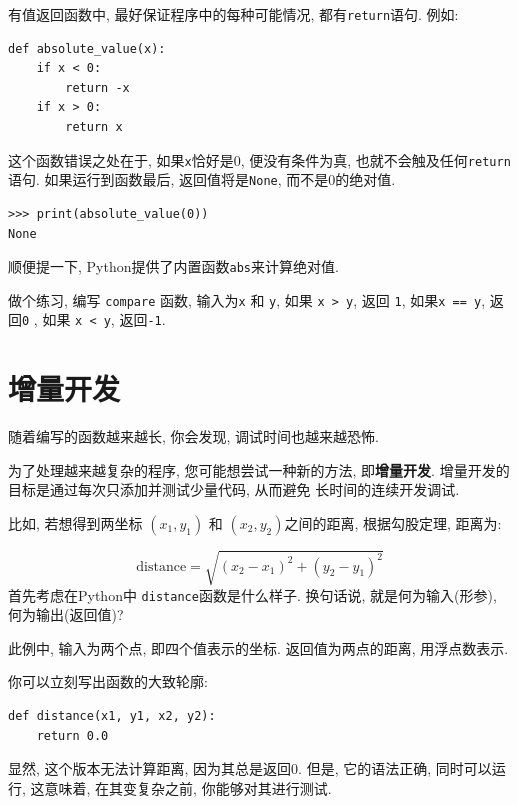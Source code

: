 \documentclass[10pt]{book}
\begin{document}
有值返回函数中, 最好保证程序中的每种可能情况, 都有{\tt return}语句. 例如:

\begin{verbatim}
def absolute_value(x):
    if x < 0:
        return -x
    if x > 0:
        return x
\end{verbatim}
%

这个函数错误之处在于, 如果{\tt x}恰好是0,
便没有条件为真, 也就不会触及任何{\tt return}语句. 
如果运行到函数最后, 返回值将是{\tt None}, 而不是0的绝对值. 

\begin{verbatim}
>>> print(absolute_value(0))
None
\end{verbatim}
%
顺便提一下, Python提供了内置函数{\tt abs}来计算绝对值. 

做个练习, 编写 {\tt compare} 函数, 输入为{\tt x} 和 {\tt y}, 
如果 {\tt x > y},  返回 {\tt 1}, 
如果{\tt x == y},  返回{\tt 0} , 
如果 {\tt x < y},  返回{\tt -1}. 


\section{增量开发}
\label{incremental.development}

随着编写的函数越来越长, 你会发现, 调试时间也越来越恐怖. 

为了处理越来越复杂的程序, 您可能想尝试一种新的方法, 即{\bf 增量开发}.
增量开发的目标是通过每次只添加并测试少量代码, 从而避免
长时间的连续开发调试. 

比如, 若想得到两坐标 $(x_1, y_1)$ 和 $(x_2, y_2)$之间的距离, 
根据勾股定理, 距离为:

\begin{displaymath}
\mathrm{distance} = \sqrt{(x_2 - x_1)^2 + (y_2 - y_1)^2}
\end{displaymath}
%
首先考虑在Python中 {\tt distance}函数是什么样子. 换句话说, 就是何为输入(形参), 
何为输出(返回值)?

此例中, 输入为两个点, 即四个值表示的坐标. 返回值为两点的距离, 用浮点数表示. 

你可以立刻写出函数的大致轮廓:

\begin{verbatim}
def distance(x1, y1, x2, y2):
    return 0.0
\end{verbatim}
%
显然, 这个版本无法计算距离, 因为其总是返回0.
但是, 它的语法正确, 同时可以运行, 
这意味着, 在其变复杂之前, 你能够对其进行测试. 
\end{document}
